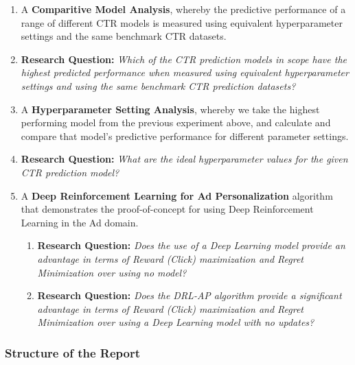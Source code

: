 \documentclass{mldsmsc}
\begin{document}
\begin{enumerate}
    \item \label{exp:comparative-model-analysis} A \textbf{Comparitive Model Analysis}, whereby the predictive performance of a range of different CTR models
    is measured using equivalent hyperparameter settings and the same benchmark CTR datasets.
    \item[] \textbf{Research Question:} \emph{Which of the CTR prediction models in scope have the highest predicted performance
    when measured using equivalent hyperparameter settings and using the same benchmark CTR prediction datasets?}
    \item \label{exp:hyperparameter-analysis} A \textbf{Hyperparameter Setting Analysis}, whereby we take the highest performing model from the previous
    experiment above, and calculate and compare that model's predictive performance for different parameter settings.
    \item[] \textbf{Research Question:} \emph{What are the ideal hyperparameter values for the given CTR prediction model?}
    \item \label{exp:rl-sim} A \textbf{Deep Reinforcement Learning for Ad Personalization} algorithm that demonstrates the
    proof-of-concept for using Deep Reinforcement Learning in the Ad domain. 
    \begin{enumerate}
        \item \label{exp:dcn-model-advantage} \textbf{Research Question:} \emph{Does the use of a Deep Learning model provide an
        advantage in terms of Reward (Click) maximization and Regret Minimization over using no model?}
        \item \label{exp:drl-ap-advantage} \textbf{Research Question:} \emph{Does the DRL-AP algorithm provide a significant
        advantage in terms of Reward (Click) maximization and Regret Minimization over using a Deep Learning model
        with no updates?}
    \end{enumerate}
\end{enumerate}

\subsubsection{Structure of the Report}
\end{document}
